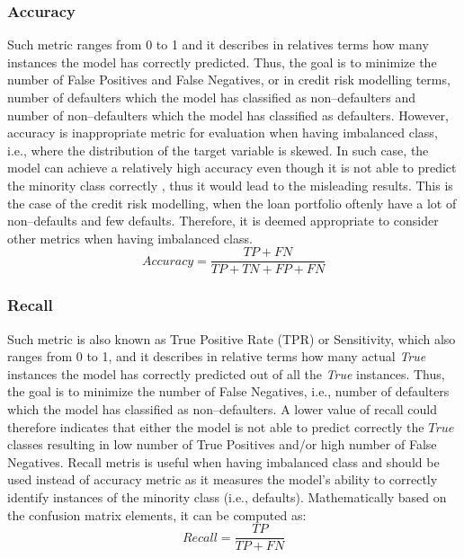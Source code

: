 \subsubsection{Accuracy}
Such metric ranges from 0 to 1 and it describes in relatives terms how many instances the model has correctly predicted. Thus, the goal is to minimize the number of False Positives and False Negatives, or in credit risk modelling terms, number of defaulters which the model has classified as non--defaulters and number of non--defaulters which the model has classified as defaulters.
However, accuracy is inappropriate metric for evaluation when having imbalanced class, i.e., where the distribution of the target variable is skewed.
In such case, the model can achieve a relatively high accuracy even though it is not able to predict the minority class correctly \citep{brownlee2021failure}, thus it would lead to the misleading results.
This is the case of the credit risk modelling, when the loan portfolio oftenly have a lot of non--defaults and few defaults.
Therefore, it is deemed appropriate to consider other metrics when having imbalanced class.
\begin{equation}\label{eq}
    Accuracy = \frac{TP + FN}{TP + TN + FP + FN}
\end{equation}

\subsubsection{Recall}
Such metric is also known as True Positive Rate (TPR) or Sensitivity, which also ranges from 0 to 1, and it describes in relative terms how many actual \textit{True} instances the model has correctly predicted out of all the \textit{True} instances. Thus, the goal is to minimize the number of False Negatives, i.e., number of defaulters which the model has classified as non--defaulters.
A lower value of recall could therefore indicates that either the model is not able to predict correctly the $True$ classes resulting in low number of True Positives and/or high number of False Negatives.
Recall metris is useful when having imbalanced class and should be used instead of accuracy metric as it measures the model's ability to correctly identify instances of the minority class (i.e., defaults).
Mathematically based on the confusion matrix elements, it can be computed as:
\begin{equation}\label{eq}
    Recall = \frac{TP}{TP + FN}
\end{equation}

